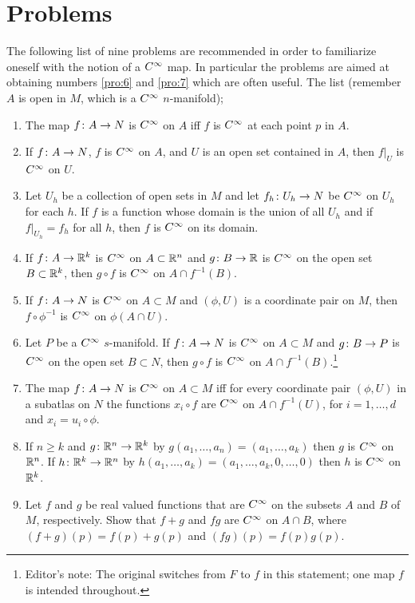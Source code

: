 \documentclass[../main]{subfiles}
\begin{document}
\section*{Problems}\label{ch01:ex1}

The following list of nine problems are recommended in order to familiarize oneself with the notion of a $C^\infty$ map. In particular the problems are aimed at obtaining numbers \ref{pro:6} and \ref{pro:7} which are often useful. The list (remember $A$ is open in $M$, which is a $C^\infty$ $n$-manifold);

\begin{enumerate}
    \item\label{pro:1} The map $f\colon A\to N$ is $C^\infty$ on $A$ iff $f$ is $C^\infty$ at each point $p$ in $A$.
    \item\label{pro:2} If $f\colon A\to N$, $f$ is $C^\infty$ on $A$, and $U$ is an open set contained in $A$, then $f|_U$ is $C^\infty$ on $U$.
    \item\label{pro:3} Let $U_h$ be a collection of open sets in $M$ and let $f_h\colon U_h\to N$ be $C^\infty$ on $U_h$ for each $h$. If $f$ is a function whose domain is the union of all $U_h$ and if $f\vert_{U_h}=f_h$ for all $h$, then $f$ is $C^\infty$ on its domain.
    \item\label{pro:4} If $f\colon A\to\mathbb{R}^k$ is $C^\infty$ on $A\subset\mathbb{R}^n$ and $g\colon B\to\mathbb{R}$ is $C^\infty$ on the open set $B\subset\mathbb{R}^k$, then $g\circ f$ is $C^\infty$ on $A\cap f^{-1}(B)$.
    \item\label{pro:5} If $f\colon A\to N$ is $C^\infty$ on $A\subset M$ and $(\phi, U)$ is a coordinate pair on $M$, then $f\circ\phi^{-1}$ is $C^\infty$ on $\phi(A\cap U)$.
    \item\label{pro:6} Let $P$ be a $C^\infty$ $s$-manifold. If $f\colon A\to N$ is $C^\infty$ on $A\subset M$ and $g\colon B\to P$ is $C^\infty$ on the open set $B\subset N$, then $g\circ f$ is $C^\infty$ on $A\cap f^{-1}(B)$.\footnote{Editor's note: The original switches from $F$ to $f$ in this statement; one map $f$ is intended throughout.}
    \item\label{pro:7} The map $f\colon A\to N$ is $C^\infty$ on $A\subset M$ iff for every coordinate pair $(\phi,U)$ in a subatlas on $N$ the functions $x_i\circ f$ are $C^\infty$ on $A\cap f^{-1}(U)$, for $i=1,\dots,d$ and $x_i=u_i\circ\phi$.
    \item\label{pro:8} If $n\geq k$ and $g\colon\mathbb{R}^n\to\mathbb{R}^k$ by $g(a_1,\dots,a_n)=(a_1,\dots,a_k)$ then $g$ is $C^\infty$ on $\mathbb{R}^n$. If $h\colon\mathbb{R}^k\to\mathbb{R}^n$ by $h(a_1,\dots,a_k)=(a_1,\dots,a_k,0,\dots,0)$ then $h$ is $C^\infty$ on $\mathbb{R}^k$.
    \item\label{pro:9} Let $f$ and $g$ be real valued functions that are $C^\infty$ on the subsets $A$ and $B$ of $M$, respectively. Show that $f+g$ and $fg$ are $C^\infty$ on $A\cap B$, where $(f+g)(p)=f(p)+g(p)$ and $(fg)(p)=f(p)g(p)$.
\end{enumerate}
\end{document}
